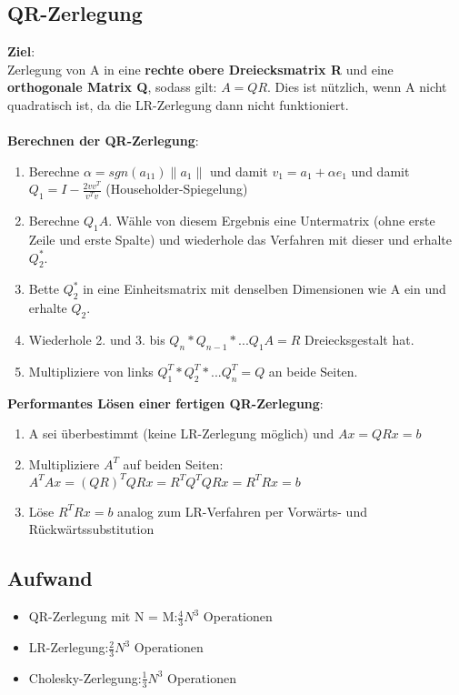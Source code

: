 \documentclass[10pt,a4paper]{article}
\newcommand{\norm}[1]{\lVert#1\rVert}
\begin{document}
	\subsection{QR-Zerlegung}
	\textbf{Ziel}:\\Zerlegung von A in eine \textbf{rechte obere Dreiecksmatrix R} und eine \textbf{orthogonale Matrix Q}, sodass gilt: $A = QR$. Dies ist nützlich, wenn A nicht quadratisch ist, da die LR-Zerlegung dann nicht funktioniert.\\\\
	\textbf{Berechnen der QR-Zerlegung}:
	\begin{enumerate}
		\item Berechne $\alpha = sgn(a_{11})\norm{a_1}$ und damit $v_1 = a_1 + \alpha e_1$ und damit $Q_1 = I - \frac{2vv^T}{v^Tv}$ (Householder-Spiegelung)
		\item Berechne $Q_1A$. Wähle von diesem Ergebnis eine Untermatrix (ohne erste Zeile und erste Spalte) und wiederhole das Verfahren mit dieser und erhalte $Q_2^*$.
		\item Bette $Q_2^*$ in eine Einheitsmatrix mit denselben Dimensionen wie A ein und erhalte $Q_2$.
		\item Wiederhole 2. und 3. bis $Q_n * Q_{n - 1} * ... Q_1A = R$ Dreiecksgestalt hat.
		\item Multipliziere von links $Q_1^T * Q_2^T * ... Q_n^T = Q$ an beide Seiten.
	\end{enumerate}
	\newpage
	\noindent\textbf{Performantes Lösen einer fertigen QR-Zerlegung}:
	\begin{enumerate}
		\item A sei überbestimmt (keine LR-Zerlegung möglich) und $Ax = QRx = b$
		\item Multipliziere $A^T$ auf beiden Seiten: $A^TAx = (QR)^TQRx = R^TQ^TQRx = R^TRx = b$
		\item Löse $R^TRx = b$ analog zum LR-Verfahren per Vorwärts- und Rückwärtssubstitution
	\end{enumerate}
	\subsection{Aufwand}
	\begin{itemize}
		\item QR-Zerlegung mit N = M:\hfill$\frac{4}{3}N^3$ Operationen
		\item LR-Zerlegung:\hfill$\frac{2}{3}N^3$ Operationen
		\item Cholesky-Zerlegung:\hfill$\frac{1}{3}N^3$ Operationen
	\end{itemize}
	\newpage
\end{document}
